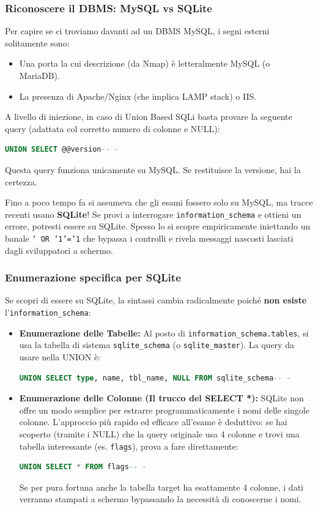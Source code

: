 \documentclass[12pt,a4paper]{report}
\begin{document}
	\subsubsection{Riconoscere il DBMS: MySQL vs SQLite}
	Per capire se ci troviamo davanti ad un DBMS MySQL, i segni esterni solitamente sono:
	\begin{itemize}
		\item Una porta la cui descrizione (da Nmap) è letteralmente MySQL (o MariaDB).
		\item La presenza di Apache/Nginx (che implica LAMP stack) o IIS.
	\end{itemize}
	A livello di iniezione, in caso di Union Based SQLi basta provare la seguente query (adattata col corretto numero di colonne e NULL):
	\begin{lstlisting}[language=SQL]
		UNION SELECT @@version-- -
	\end{lstlisting}
	Questa query funziona unicamente su MySQL. Se restituisce la versione, hai la certezza.
	
	\begin{nota}
		Fino a poco tempo fa si assumeva che gli esami fossero solo su MySQL, ma tracce recenti usano \textbf{SQLite}! Se provi a interrogare \texttt{information\_schema} e ottieni un errore, potresti essere su SQLite. Spesso lo si scopre empiricamente iniettando un banale \texttt{' OR '1'='1} che bypassa i controlli e rivela messaggi nascosti lasciati dagli sviluppatori a schermo.
	\end{nota}
	
	\subsubsection{Enumerazione specifica per SQLite}
	Se scopri di essere su SQLite, la sintassi cambia radicalmente poiché \textbf{non esiste} l'\texttt{information\_schema}:
	\begin{itemize}
		\item \textbf{Enumerazione delle Tabelle:} Al posto di \texttt{information\_schema.tables}, si usa la tabella di sistema \texttt{sqlite\_schema} (o \texttt{sqlite\_master}). La query da usare nella UNION è:
		\begin{lstlisting}[language=SQL]
			UNION SELECT type, name, tbl_name, NULL FROM sqlite_schema-- -
		\end{lstlisting}
		\item \textbf{Enumerazione delle Colonne (Il trucco del SELECT *):} SQLite non offre un modo semplice per estrarre programmaticamente i nomi delle singole colonne. L'approccio più rapido ed efficace all'esame è deduttivo: se hai scoperto (tramite i NULL) che la query originale usa 4 colonne e trovi una tabella interessante (es. \texttt{flags}), prova a fare direttamente:
		\begin{lstlisting}[language=SQL]
			UNION SELECT * FROM flags-- -
		\end{lstlisting}
		Se per pura fortuna anche la tabella target ha esattamente 4 colonne, i dati verranno stampati a schermo bypassando la necessità di conoscerne i nomi.
	\end{itemize}
	
\end{document}

